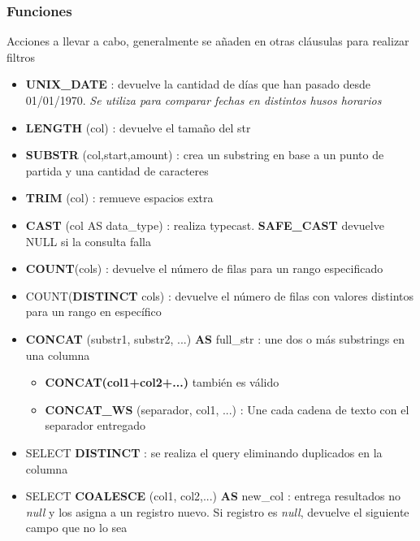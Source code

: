\subsubsection{Funciones}
Acciones a llevar a cabo, generalmente se añaden en otras cláusulas para realizar filtros
\begin{itemize}
    \item {\textbf{UNIX\_DATE} : devuelve la cantidad de días que han pasado desde 01/01/1970. \textit{Se utiliza para comparar fechas en distintos husos horarios}}
    \item {\textbf{LENGTH} (col) : devuelve el tamaño del \gls{str}}
    \item {\textbf{SUBSTR} (col,start,amount) : crea un substring en base a un punto de partida y una cantidad de caracteres}
    \item {\textbf{TRIM} (col) : remueve espacios extra}
    \item {\textbf{CAST} (col AS data\_type) : realiza \gls{typecast}. \textbf{SAFE\_CAST} devuelve NULL si la consulta falla}
    \item {\textbf{COUNT}(cols) : devuelve el número de filas para un rango especificado}
    \item {COUNT(\textbf{DISTINCT} cols) : devuelve el número de filas con valores distintos para un rango en específico}
    \item {\textbf{CONCAT} (substr1, substr2, ...) \textbf{AS} full\_str : une dos o más substrings en una columna
    \begin{itemize}
        \item {\textbf{CONCAT(col1+col2+...)} también es válido}
        \item {\textbf{CONCAT\_WS} (separador, col1, ...) : Une cada cadena de texto con el separador entregado}
    \end{itemize}}
    \item {SELECT \textbf{DISTINCT} : se realiza el query eliminando duplicados en la columna}
    \item {SELECT \textbf{COALESCE} (col1, col2,...) \textbf{AS} new\_col : entrega resultados no \textit{null} y los asigna a un registro nuevo. Si registro es \textit{null}, devuelve el siguiente campo que no lo sea}
    
\end{itemize}


